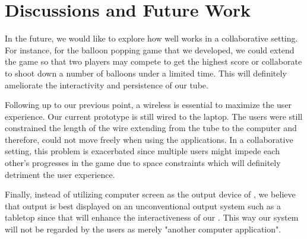 \section{Discussions and Future Work}\label{sec:fut-work}

In the future, we would like to explore how well \tube works in a collaborative setting. For instance, for the balloon popping game that we developed, we could extend the game so that two players may compete to get the highest score or collaborate to shoot down a number of balloons under a limited time. This will definitely ameliorate the interactivity and persistence of our tube.

Following up to our previous point, a wireless \tube is essential to maximize the user experience. Our current \tube prototype is still wired to the laptop. The users were still constrained the length of the wire extending from the tube to the computer and therefore, could not move freely when using the applications. In a collaborative setting, this problem is exacerbated since multiple users might impede each other's progresses in the game due to space constraints which will definitely detriment the user experience.

Finally, instead of utilizing computer screen as the output device of \tube, we believe that \tube output is best displayed on an unconventional output system such as a tabletop since that will enhance the interactiveness of our \tube. This way our \tube system will not be regarded by the users as merely "another computer application".
